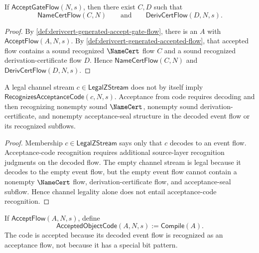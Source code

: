 \begin{theorem}
\label{thm:derivcert-generated-accepted-requires-namecert-derivcert}
If $\mathsf{AcceptGateFlow}(N,s)$, then there exist $C,D$ such that
$$
  \mathsf{NameCertFlow}(C,N)
  \qquad\text{and}\qquad
  \mathsf{DerivCertFlow}(D,N,s).
$$
\end{theorem}

\begin{proof}
By \autoref{def:derivcert-generated-accept-gate-flow}, there is an $A$ with $\mathsf{AcceptFlow}(A,N,s)$. By \autoref{def:derivcert-generated-accepted-flow}, that accepted flow contains a sound recognized $\NameCert$ flow $C$ and a sound recognized derivation-certificate flow $D$. Hence $\mathsf{NameCertFlow}(C,N)$ and $\mathsf{DerivCertFlow}(D,N,s)$.
\end{proof}

\begin{corollary}
\label{cor:derivcert-generated-code-existence-not-acceptance}
A legal channel stream $c \in \mathsf{LegalZStream}$ does not by itself imply $\mathsf{RecognizesAcceptanceCode}(c,N,s)$. Acceptance from code requires decoding and then recognizing nonempty sound $\NameCert$, nonempty sound derivation-certificate, and nonempty acceptance-seal structure in the decoded event flow or its recognized subflows.
\end{corollary}

\begin{proof}
Membership $c \in \mathsf{LegalZStream}$ says only that $c$ decodes to an event flow. Acceptance-code recognition requires additional source-layer recognition judgments on the decoded flow. The empty channel stream is legal because it decodes to the empty event flow, but the empty event flow cannot contain a nonempty $\NameCert$ flow, derivation-certificate flow, and acceptance-seal subflow. Hence channel legality alone does not entail acceptance-code recognition.
\end{proof}

\begin{definition}
\label{def:derivcert-generated-accepted-object-code}
If $\mathsf{AcceptFlow}(A,N,s)$, define
$$
  \mathsf{AcceptedObjectCode}(A,N,s) := \mathsf{Compile}(A).
$$
The code is accepted because its decoded event flow is recognized as an acceptance flow, not because it has a special bit pattern.
\end{definition}

